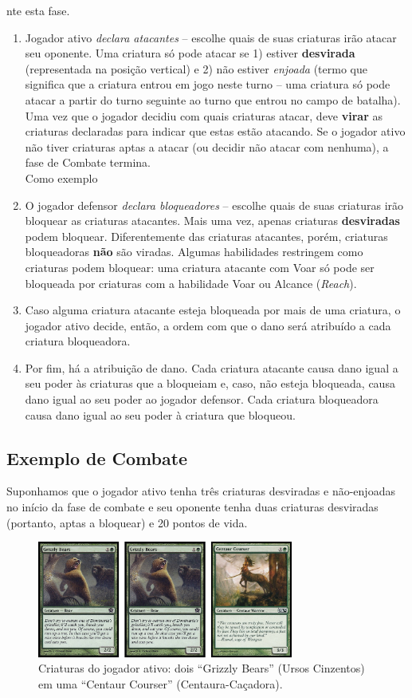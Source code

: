 nte esta fase.

\begin{enumerate}
  \item Jogador ativo \textit{declara atacantes} -- escolhe
quais de suas criaturas irão atacar seu oponente. Uma criatura só pode atacar se 1) estiver \textbf{desvirada} (representada na posição vertical) e 2) não estiver \textit{enjoada} (termo que significa que a criatura entrou em jogo neste turno -- uma criatura só pode atacar a partir do turno seguinte ao turno que entrou no campo de batalha). Uma vez que o jogador decidiu com quais criaturas atacar, deve \textbf{virar} as criaturas declaradas para indicar que estas estão atacando. Se o jogador ativo não tiver criaturas aptas a atacar (ou decidir não atacar com nenhuma), a fase de Combate termina.
\\ Como exemplo
    \item O jogador defensor \textit{declara bloqueadores} -- escolhe quais de suas criaturas irão
bloquear as criaturas atacantes. Mais uma vez, apenas criaturas \textbf{desviradas} podem bloquear. Diferentemente das criaturas atacantes, porém, criaturas bloqueadoras \textbf{não} são viradas. Algumas habilidades restringem como criaturas podem bloquear: uma criatura atacante com Voar só pode ser bloqueada por criaturas com a habilidade Voar ou Alcance (\textit{Reach}).
    \item Caso alguma criatura atacante esteja bloqueada
por mais de uma criatura, o jogador ativo decide, então, a ordem com que o dano será
atribuído a cada criatura bloqueadora.
    \item Por fim, há a atribuição de dano. Cada criatura atacante causa dano igual a seu poder às criaturas que a bloqueiam e, caso, não esteja bloqueada, causa dano igual ao seu poder ao jogador defensor. Cada criatura bloqueadora causa dano igual ao seu poder à criatura que bloqueou.
\end{enumerate}

\subsection{Exemplo de Combate}

Suponhamos que o jogador ativo tenha três criaturas desviradas e não-enjoadas no início da fase de combate e seu oponente tenha duas criaturas desviradas (portanto, aptas a bloquear) e 20 pontos de vida.

\begin{figure}[!h]
  \centering
  \includegraphics[width=0.75\textwidth]{picstcc/att1.png}
  \caption{Criaturas do jogador ativo: dois ``Grizzly Bears'' (Ursos Cinzentos) em uma ``Centaur Courser'' (Centaura-Caçadora).}
  \label{beginattack}
\end{figure}

